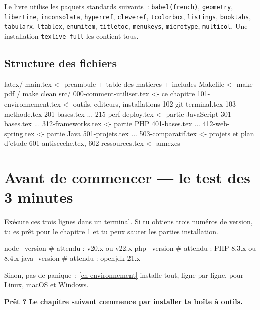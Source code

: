 \documentclass[12pt,a4paper,twoside,openright]{book}
\begin{document}
\begin{note}
Le livre utilise les paquets standards suivants~: \texttt{babel(french)}, \texttt{geometry},
\texttt{libertine}, \texttt{inconsolata}, \texttt{hyperref}, \texttt{cleveref},
\texttt{tcolorbox}, \texttt{listings}, \texttt{booktabs}, \texttt{tabularx},
\texttt{ltablex}, \texttt{enumitem}, \texttt{titletoc}, \texttt{menukeys}, \texttt{microtype},
\texttt{multicol}. Une installation \texttt{texlive-full} les contient tous.
\end{note}

\subsection{Structure des fichiers}

\begin{codeplain}
latex/
  main.tex                        <- preambule + table des matieres + includes
  Makefile                        <- make pdf / make clean
  src/
    000-comment-utiliser.tex      <- ce chapitre
    101-environnement.tex         <- outils, editeurs, installations
    102-git-terminal.tex
    103-methode.tex
    201-bases.tex  ...  215-perf-deploy.tex     <- partie JavaScript
    301-bases.tex  ...  312-frameworks.tex       <- partie PHP
    401-bases.tex  ...  412-web-spring.tex        <- partie Java
    501-projets.tex ... 503-comparatif.tex        <- projets et plan d'etude
    601-antisecche.tex, 602-ressources.tex       <- annexes
\end{codeplain}

\section*{Avant de commencer --- le test des 3 minutes}

Ex\'ecute ces trois lignes dans un terminal. Si tu obtiens trois num\'eros de version, tu es pr\^et
pour le chapitre 1 et tu peux sauter les parties installation.

\begin{terminal}
node --version    # attendu : v20.x ou v22.x
php --version     # attendu : PHP 8.3.x ou 8.4.x
java -version     # attendu : openjdk 21.x
\end{terminal}

Sinon, pas de panique~: \cref{ch-environnement} installe tout, ligne par ligne, pour
Linux, macOS et Windows.

\begin{center}
\Large\bfseries\color{themecolor}
Pr\^et ? Le chapitre suivant commence par installer ta bo\^ite \`a outils.
\end{center}
\end{document}
